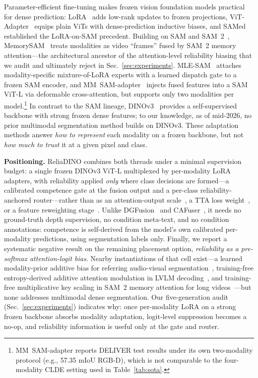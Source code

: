 Parameter-efficient fine-tuning makes frozen vision foundation models practical for dense prediction: LoRA~\cite{lora2022} adds low-rank updates to frozen projections, ViT-Adapter~\cite{vitadapter2023} equips plain ViTs with dense-prediction inductive biases, and SAMed~\cite{samed2023} established the LoRA-on-SAM precedent. Building on SAM and SAM~2~\cite{sam2023,sam2_2024}, MemorySAM~\cite{memorysam2025} treats modalities as video ``frames'' fused by SAM~2 memory attention---the architectural ancestor of the attention-level reliability biasing that we audit and ultimately reject in Sec.~\ref{sec:experiments}. MLE-SAM~\cite{mlesam} attaches modality-specific mixture-of-LoRA experts with a learned dispatch gate to a frozen SAM encoder, and MM~SAM-adapter~\cite{mmsamadapter2025} injects fused features into a SAM ViT-L via deformable cross-attention, but supports only two modalities per model.\footnote{MM~SAM-adapter reports DELIVER test results under its own two-modality protocol (e.g., 57.35 mIoU RGB-D), which is not comparable to the four-modality CLDE setting used in Table~\ref{tab:sota}.} In contrast to the SAM lineage, DINOv3~\cite{dinov3_2025} provides a self-supervised backbone with strong frozen dense features; to our knowledge, as of mid-2026, no prior multimodal segmentation method builds on DINOv3. These adaptation methods answer \emph{how to represent} each modality on a frozen backbone, but not \emph{how much to trust} it at a given pixel and class.

\medskip
\noindent\textbf{Positioning.}
ReliaDINO combines both threads under a minimal supervision budget: a single frozen DINOv3 ViT-L multiplexed by per-modality LoRA adapters, with reliability applied \emph{only} where class decisions are formed---a calibrated competence gate at the fusion output and a per-class reliability-anchored router---rather than as an attention-output scale~\cite{relifusion2025}, a TTA loss weight~\cite{read2024}, or a feature reweighting stage~\cite{hyperdum2025}. Unlike DGFusion~\cite{dgfusion2026} and CAFuser~\cite{cafuser2025}, it needs no ground-truth depth supervision, no condition meta-text, and no condition annotations: competence is self-derived from the model's own calibrated per-modality predictions, using segmentation labels only. Finally, we report a systematic negative result on the remaining placement option, \emph{reliability as a pre-softmax attention-logit bias}. Nearby instantiations of that cell exist---a learned modality-prior additive bias for referring audio-visual segmentation~\cite{primed2026}, training-free entropy-derived additive attention modulation in LVLM decoding~\cite{sae2026}, and training-free multiplicative key scaling in SAM~2 memory attention for long videos~\cite{sam2long2024}---but none addresses multimodal dense segmentation. Our five-generation audit (Sec.~\ref{sec:experiments}) indicates why: once per-modality LoRA on a strong frozen backbone absorbs modality adaptation, logit-level suppression becomes a no-op, and reliability information is useful only at the gate and router.
